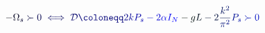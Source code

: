\documentclass[12pt]{article}
\begin{document}
\makeatletter
\renewcommand*{\@textcolor}[3]{%
  \protect\leavevmode
  \begingroup
    \color#1{#2}#3%
  \endgroup
}
\makeatother
\begin{displaymath}
\mathcolor[RGB]{0,0,15}{-} \mathcolor[RGB]{0,0,30}{\Omega} _ { \mathcolor[RGB]{0,0,45}{s} } \mathcolor[RGB]{0,0,60}{\succ} \mathcolor[RGB]{0,0,75}{0} \mathcolor[RGB]{0,0,90}{\iff} \mathcal { \mathcolor[RGB]{0,0,105}{D} } \mathcolor[RGB]{0,0,120}{\coloneqq} \mathcolor[RGB]{0,0,135}{2} \mathcolor[RGB]{0,0,150}{k} \mathcolor[RGB]{0,0,165}{P} _ { \mathcolor[RGB]{0,0,180}{s} } \mathcolor[RGB]{0,0,195}{-} \mathcolor[RGB]{0,0,210}{2} \mathcolor[RGB]{0,0,225}{\alpha} \mathcolor[RGB]{0,0,240}{I} _ { \mathcolor[RGB]{0,0,255}{N} } \mathcolor[RGB]{0,15,0}{-} \mathcolor[RGB]{0,15,15}{g} \mathcolor[RGB]{0,15,30}{L} \mathcolor[RGB]{0,15,45}{-} \mathcolor[RGB]{0,15,60}{2} \mathcolor[RGB]{0,15,75}{\frac { \mathcolor[RGB]{0,15,90}{k} ^ { \mathcolor[RGB]{0,15,105}{2} } } { \mathcolor[RGB]{0,15,120}{\pi} ^ { \mathcolor[RGB]{0,15,135}{2} } } } \mathcolor[RGB]{0,15,150}{P} _ { \mathcolor[RGB]{0,15,165}{s} } \mathcolor[RGB]{0,15,180}{\succ} \mathcolor[RGB]{0,15,195}{0}
\end{displaymath}
\end{document}
